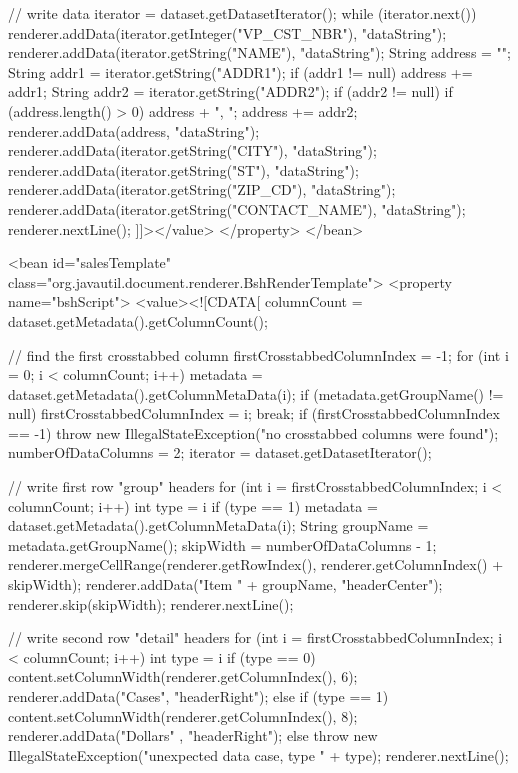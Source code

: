 \documentclass[letterpaper,10pt]{article}
\begin{document}
\begin{verbatimtab}
	// write data
	iterator = dataset.getDatasetIterator();
	while (iterator.next()) {
		renderer.addData(iterator.getInteger("VP_CST_NBR"), "dataString");
		renderer.addData(iterator.getString("NAME"), "dataString");
		String address = "";
		String addr1 = iterator.getString("ADDR1");
		if (addr1 != null) {
		address += addr1;
		}
		String addr2 = iterator.getString("ADDR2");
		if (addr2 != null) {
		if (address.length() > 0) {
			address + ", ";
		}
		address += addr2;
		}
		renderer.addData(address, "dataString");
		renderer.addData(iterator.getString("CITY"), "dataString");
		renderer.addData(iterator.getString("ST"), "dataString");
		renderer.addData(iterator.getString("ZIP_CD"), "dataString");
		renderer.addData(iterator.getString("CONTACT_NAME"), "dataString");
		renderer.nextLine();
	}
		]]></value>
	</property>
</bean>

<bean id="salesTemplate" class="org.javautil.document.renderer.BshRenderTemplate">
	<property name="bshScript">
		<value><![CDATA[
	columnCount = dataset.getMetadata().getColumnCount();
			
	// find the first crosstabbed column
	firstCrosstabbedColumnIndex = -1;
	for (int i = 0; i < columnCount; i++) {
	metadata = dataset.getMetadata().getColumnMetaData(i);
	if (metadata.getGroupName() != null) {
		firstCrosstabbedColumnIndex = i;
		break;
		}
	}
	if (firstCrosstabbedColumnIndex == -1) {
		throw new IllegalStateException("no crosstabbed columns were found");
	}
	numberOfDataColumns = 2;
	iterator = dataset.getDatasetIterator();	
	
	// write first row "group" headers
	for (int i = firstCrosstabbedColumnIndex; i < columnCount; i++) {
		int type = i %
		if (type == 1) {
		metadata = dataset.getMetadata().getColumnMetaData(i);
		String groupName = metadata.getGroupName();
		skipWidth = numberOfDataColumns - 1;
		renderer.mergeCellRange(renderer.getRowIndex(), renderer.getColumnIndex() + skipWidth);
		renderer.addData("Item " + groupName, "headerCenter");
		renderer.skip(skipWidth);
		}
	}	
	renderer.nextLine();
	
	// write second row "detail" headers
	for (int i = firstCrosstabbedColumnIndex; i < columnCount; i++) {
		int type = i %
		if (type == 0) {
		content.setColumnWidth(renderer.getColumnIndex(), 6);
		renderer.addData("Cases", "headerRight");			
		} else if (type == 1) {
		content.setColumnWidth(renderer.getColumnIndex(), 8);
		renderer.addData("Dollars" , "headerRight");
		} else {
		throw new IllegalStateException("unexpected data case, type " + type);
		}
	}
	renderer.nextLine();
			

\end{verbatimtab}
\end{document}

